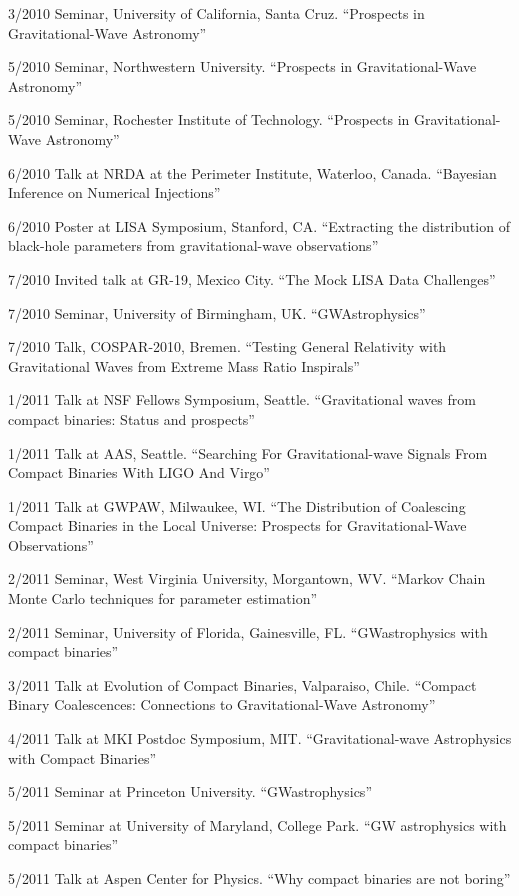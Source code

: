 \documentclass[margin,line]{res}
\begin{document}
\begin{resume}
3/2010	Seminar, University of California, Santa Cruz. ``Prospects in Gravitational-Wave Astronomy''

5/2010	Seminar, Northwestern University. ``Prospects in Gravitational-Wave Astronomy''

5/2010	Seminar, Rochester Institute of Technology. ``Prospects in Gravitational-Wave Astronomy''

6/2010	Talk at NRDA at the Perimeter Institute, Waterloo, Canada. ``Bayesian Inference on Numerical Injections''

6/2010	Poster at LISA Symposium, Stanford, CA.  ``Extracting the distribution of black-hole parameters from gravitational-wave observations''

7/2010	Invited talk at GR-19, Mexico City.  ``The Mock LISA Data Challenges''

7/2010	Seminar, University of Birmingham, UK.  ``GWAstrophysics''

7/2010	Talk, COSPAR-2010, Bremen.  ``Testing General Relativity with Gravitational Waves from Extreme Mass Ratio Inspirals''

1/2011 	Talk at NSF Fellows Symposium, Seattle. 	``Gravitational waves from compact binaries: Status and prospects''

1/2011 	Talk at AAS, Seattle. 	``Searching For Gravitational-wave Signals From Compact Binaries With LIGO And Virgo''

1/2011 	Talk at GWPAW, Milwaukee, WI.	 ``The Distribution of Coalescing Compact Binaries in the Local Universe: Prospects for Gravitational-Wave Observations''

2/2011 	Seminar, West Virginia University, Morgantown, WV. 	``Markov Chain Monte Carlo techniques for parameter estimation''

2/2011 	Seminar, University of Florida, Gainesville, FL. 	``GWastrophysics with compact binaries''

3/2011 	Talk at Evolution of Compact Binaries, Valparaiso, Chile. 	``Compact Binary Coalescences: Connections to Gravitational-Wave Astronomy'' 

4/2011 	Talk 	at MKI Postdoc Symposium, MIT. 	``Gravitational-wave Astrophysics with Compact Binaries''

5/2011 	Seminar 	at Princeton University.	``GWastrophysics''

5/2011 	Seminar 	at University of Maryland, College Park. 	``GW astrophysics with compact binaries''

5/2011 	Talk at Aspen Center for Physics. 	``Why compact binaries are not boring''


\end{resume}
\end{document}
